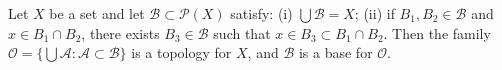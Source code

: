 Let $X$ be a set and let $\mathcal{B} \subset \mathcal{P}(X)$ satisfy:
(i) $\bigcup \mathcal{B} = X$;
(ii) if $B_1, B_2 \in \mathcal{B}$ and $x \in B_1 \cap B_2$, there exists $B_3 \in \mathcal{B}$ such that $x \in B_3 \subset B_1 \cap B_2$.
Then the family $\mathcal{O} = \{\bigcup \mathcal{A} : \mathcal{A} \subset \mathcal{B}\}$ is a topology for $X$, and $\mathcal{B}$ is a base for $\mathcal{O}$.